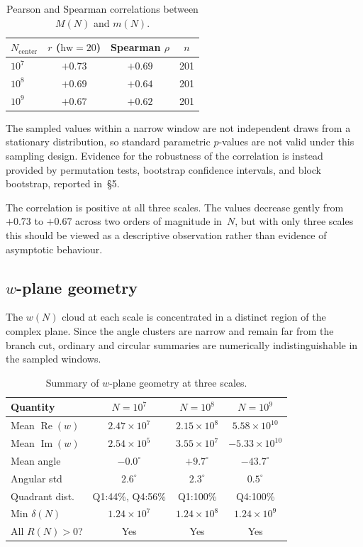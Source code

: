 \documentclass[11pt,a4paper]{article}
\newcommand{\RN}{R(N)}
\newcommand{\MN}{M(N)}
\newcommand{\mN}{m(N)}
\newcommand{\wN}{w(N)}
\begin{document}
\begin{table}[h]
\centering
\begin{tabular}{l cc c}
\toprule
$N_{\mathrm{center}}$ & $r$ ($\mathrm{hw}=20$) & Spearman $\rho$ & $n$ \\
\midrule
$10^7$ & $+0.73$ & $+0.69$ & 201 \\
$10^8$ & $+0.69$ & $+0.64$ & 201 \\
$10^9$ & $+0.67$ & $+0.62$ & 201 \\
\bottomrule
\end{tabular}
\caption{Pearson and Spearman correlations between $\MN$ and $\mN$.}
\label{tab:correlation}
\end{table}

The sampled values within a narrow window are not independent draws from a stationary distribution, so standard parametric $p$-values are not valid under this sampling design. Evidence for the robustness of the correlation is instead provided by permutation tests, bootstrap confidence intervals, and block bootstrap, reported in~\S5.

The correlation is positive at all three scales. The values decrease gently from $+0.73$ to $+0.67$ across two orders of magnitude in~$N$, but with only three scales this should be viewed as a descriptive observation rather than evidence of asymptotic behaviour.


\subsection{$w$-plane geometry}

The $\wN$ cloud at each scale is concentrated in a distinct region of the complex plane. Since the angle clusters are narrow and remain far from the branch cut, ordinary and circular summaries are numerically indistinguishable in the sampled windows.

\begin{table}[h]
\centering
\begin{tabular}{l ccc}
\toprule
Quantity & $N = 10^7$ & $N = 10^8$ & $N = 10^9$ \\
\midrule
Mean $\operatorname{Re}(w)$ & $2.47 \times 10^7$ & $2.15 \times 10^8$ & $5.58 \times 10^{10}$ \\
Mean $\operatorname{Im}(w)$ & $2.54 \times 10^5$ & $3.55 \times 10^7$ & $-5.33 \times 10^{10}$ \\
Mean angle & $-0.0^\circ$ & $+9.7^\circ$ & $-43.7^\circ$ \\
Angular std & $2.6^\circ$ & $2.3^\circ$ & $0.5^\circ$ \\
Quadrant dist. & Q1:44\%, Q4:56\% & Q1:100\% & Q4:100\% \\
Min $\delta(N)$ & $1.24 \times 10^7$ & $1.24 \times 10^8$ & $1.24 \times 10^9$ \\
All $\RN > 0$? & Yes & Yes & Yes \\
\bottomrule
\end{tabular}
\caption{Summary of $w$-plane geometry at three scales.}
\label{tab:wplane}
\end{table}
\end{document}
